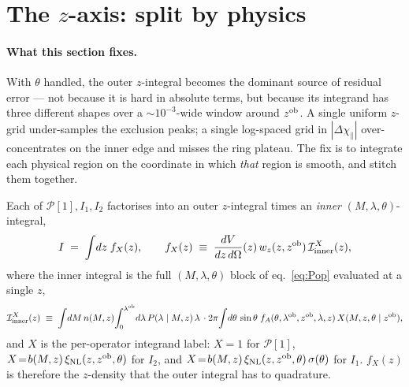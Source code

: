 \documentclass[a4paper, 11pt]{article}
\newcommand{\lob}{\lambda^{\rm ob}}
\newcommand{\zob}{z^{\rm ob}}
\newcommand{\xinl}{\xi_{\rm NL}}
\newcommand{\Pop}{\mathcal{P}}
\begin{document}
\section{\texorpdfstring{The \(z\)-axis: split by physics}{The z-axis: split by physics}}
\label{sec:zgrid}

\paragraph{What this section fixes.}
With \(\theta\) handled, the outer \(z\)-integral becomes the
dominant source of residual error --- not because it is hard in
absolute terms, but because its integrand has three different
shapes over a \(\sim\!10^{-3}\)-wide window around \(\zob\). A
single uniform \(z\)-grid under-samples the exclusion peaks; a
single log-spaced grid in \(|\Delta\chi_\parallel|\)
over-concentrates on the inner edge and misses the ring plateau.
The fix is to integrate each physical region on the coordinate in
which \emph{that} region is smooth, and stitch them together.

Each of \(\Pop[1], I_1, I_2\) factorises into an outer
\(z\)-integral times an \emph{inner} \((M,\lambda,\theta)\)-integral,
\begin{equation}
I \;=\; \int\!dz\;f_X(z),
\qquad
f_X(z)\;\equiv\;\frac{dV}{dz\,d\Omega}(z)\,w_z(z,\zob)\,
\mathcal{I}_{\rm inner}^{X}(z),
\label{eq:fz_def}
\end{equation}
where the inner integral is the full \((M,\lambda,\theta)\) block
of eq.~\eqref{eq:Pop} evaluated at a single \(z\),
\begin{equation}
\mathcal{I}_{\rm inner}^{X}(z)
\;\equiv\;
\int\!dM\,n(M,z)\!
\int_0^{\lob}\!d\lambda\,P(\lambda\mid M,z)\,\lambda\,
\cdot 2\pi\!\int\!d\theta\,\sin\theta\;
f_A(\theta,\lob,\zob,\lambda,z)\,X(M,z,\theta\mid\zob),
\label{eq:Iinner}
\end{equation}
and \(X\) is the per-operator integrand label:
\(X\!=\!1\) for \(\Pop[1]\),
\(X\!=\!b(M,z)\,\xinl(z,\zob,\theta)\) for \(I_2\), and
\(X\!=\!b(M,z)\,\xinl(z,\zob,\theta)\,\sigma(\theta)\) for \(I_1\).
\(f_X(z)\) is therefore the \(z\)-density that the outer integral
has to quadrature.
\end{document}
